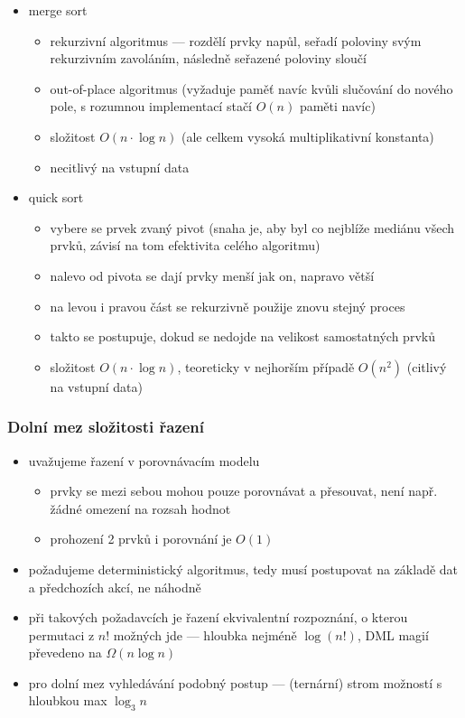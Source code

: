 \begin{itemize}
	\item merge sort 
	\begin{itemize}
		\item rekurzivní algoritmus --- rozdělí prvky napůl, seřadí poloviny svým rekurzivním zavoláním, následně seřazené poloviny sloučí
		\item out-of-place algoritmus (vyžaduje paměť navíc kvůli slučování do nového pole, s rozumnou implementací stačí $O(n)$ paměti navíc)
		\item složitost $O(n \cdot \log n)$ (ale celkem vysoká multiplikativní konstanta)
		\item necitlivý na vstupní data
	\end{itemize}
	\item quick sort 
	\begin{itemize}
		\item vybere se prvek zvaný pivot (snaha je, aby byl co nejblíže mediánu všech prvků, závisí na tom efektivita celého algoritmu)
		\item nalevo od pivota se dají prvky menší jak on, napravo větší
		\item na levou i pravou část se rekurzivně použije znovu stejný proces
		\item takto se postupuje, dokud se nedojde na velikost samostatných prvků
		\item složitost $O(n \cdot \log n)$, teoreticky v nejhorším případě $O(n^2)$ (citlivý na vstupní data)
	\end{itemize}
\end{itemize}

\subsubsection*{Dolní mez složitosti řazení}
\begin{itemize}
	\item uvažujeme řazení v porovnávacím modelu
	\begin{itemize}
		\item prvky se mezi sebou mohou pouze porovnávat a přesouvat, není např. žádné omezení na rozsah hodnot
		\item prohození 2 prvků i porovnání je $O(1)$
	\end{itemize}
	\item požadujeme deterministický algoritmus, tedy musí postupovat na základě dat a předchozích akcí, ne náhodně
	\item při takových požadavcích je řazení ekvivalentní rozpoznání, o kterou permutaci z $n!$ možných jde --- hloubka nejméně $\log (n!)$,  DML magií převedeno na $\Omega (n\log n)$
	
	\item pro dolní mez vyhledávání podobný postup --- (ternární) strom možností s hloubkou max $\log_3 n$
\end{itemize}

